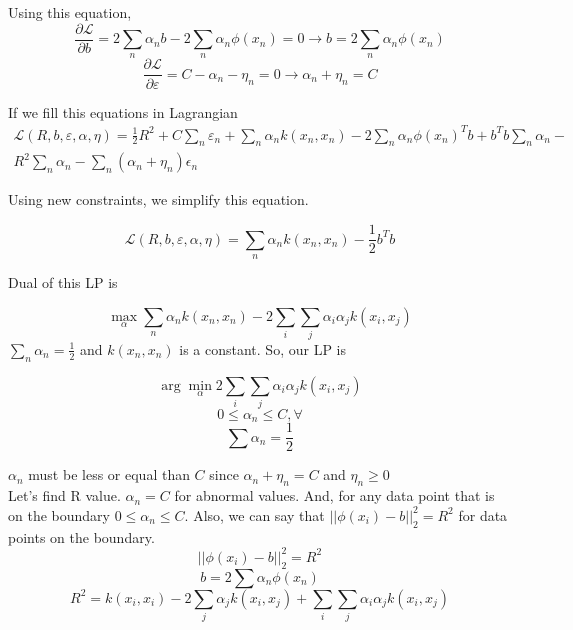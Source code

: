 \documentclass[letter,11pt]{article}
\begin{document}
	Using this equation,
	\begin{equation}
	\frac{\partial \mathcal{L}}{\partial b} = 2 \sum_{n} \alpha_n b - 2 \sum_{n} \alpha_n \phi(x_n) = 0 \rightarrow b = 2\sum_{n} \alpha_n \phi(x_n)
	\end{equation}
	\begin{equation}
	\frac{\partial \mathcal{L}}{\partial \varepsilon} = C - \alpha_n - \eta_n = 0 \rightarrow \alpha_n + \eta_n = C
	\end{equation}
	
	If we fill this equations in Lagrangian
	\begin{equation}
		\begin{aligned}
	 \mathcal{L}(R,b,\varepsilon,\alpha,\eta) = \frac{1}{2}R^2 +  C\sum_{n}\varepsilon_n + \sum_{n} \alpha_n k(x_n,x_n) - 2\sum_{n}\alpha_n \phi(x_n)^Tb + b^Tb\sum_{n}\alpha_n - \\ R^2 \sum_{n} \alpha_n - \sum_{n}(\alpha_n + \eta_n)\epsilon_n
		\end{aligned}
	\end{equation}
		
	Using new constraints, we simplify this equation.
	
	\begin{equation}
	\mathcal{L}(R,b,\varepsilon,\alpha,\eta) = \sum_{n} \alpha_n k(x_n,x_n) - \frac{1}{2}b^Tb
	\end{equation}
		
	Dual of this LP is
	
	\begin{equation}
		\max_\alpha \sum_{n} \alpha_n k(x_n,x_n) - 2 \sum_{i}\sum_{j}\alpha_i \alpha_j k(x_i,x_j)
	\end{equation}
	$\sum_{n} \alpha_n = \frac{1}{2}$ and $k(x_n,x_n)$ is a constant. So, our LP is
	
	\begin{equation}
	\arg\min_\alpha 2 \sum_{i}\sum_{j}\alpha_i \alpha_j k(x_i,x_j)
	\end{equation}
	\begin{equation}
	0 \leq \alpha_n \leq C, \forall 
	\end{equation}
	\begin{equation}
	\sum \alpha_n = \frac{1}{2}
	\end{equation}
	
	$\alpha_n$ must be less or equal than $C$ since $\alpha_n + \eta_n = C$ and $\eta_n \geq 0$\\
	
	
	Let's find R value. $\alpha_n = C$ for abnormal values. And, for any data point that is on the boundary $ 0 \leq \alpha_n \leq C$. Also, we can say that $||\phi(x_i) - b||_2^2 = R^2$ for data points on the boundary.
	\begin{equation}
	||\phi(x_i) - b||_2^2 = R^2
	\end{equation}
	\begin{equation}
	b = 2\sum \alpha_n \phi(x_n)
	\end{equation}
	\begin{equation}
	R^2 = k(x_i,x_i) - 2 \sum_{j} \alpha_j k(x_i,x_j) + \sum_{i} \sum_{j} \alpha_i\alpha_j k(x_i,x_j)
	\end{equation}
	
\end{document}
